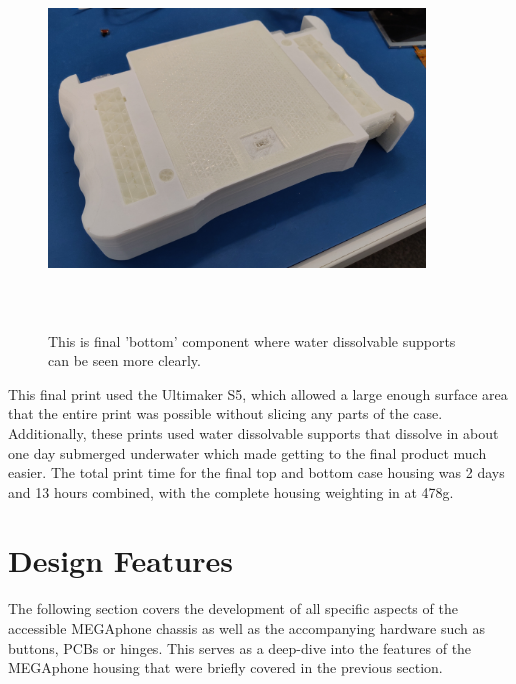 \begin{figure} [h]
    \centering
    \includegraphics[width=10cm,height=10cm,keepaspectratio]{Figures/bottomwatersupport.png}
    \caption{This is final 'bottom' component where water dissolvable supports can be seen more clearly.}
    \label{fig:thirdbottom}
\end{figure}

This final print used the Ultimaker S5, which allowed a large enough surface area that the entire print was possible without slicing any parts of the case.
Additionally, these prints used water dissolvable supports that dissolve in about one day submerged underwater which made getting to the final product much easier.
The total print time for the final top and bottom case housing was 2 days and 13 hours combined, with the complete housing weighting in at 478g.

\section{Design Features}

The following section covers the development of all specific aspects of the accessible MEGAphone chassis as well as the accompanying hardware such as buttons, PCBs or hinges.
This serves as a deep-dive into the features of the MEGAphone housing that were briefly covered in the previous section.

